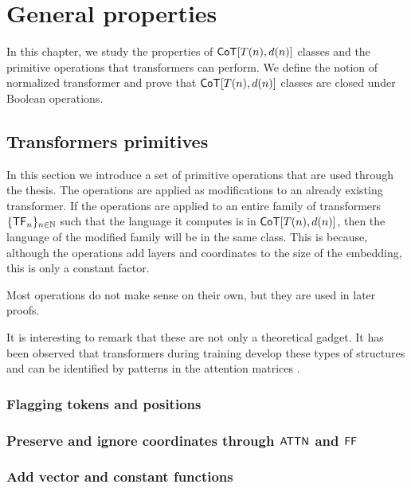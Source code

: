 \chapter{General properties}

In this chapter, we study the properties of $\mathsf{CoT}[T(n), d(n)]$ classes and the primitive operations that transformers can perform.
We define the notion of normalized transformer and prove that $\mathsf{CoT}[T(n), d(n)]$ classes are closed  under Boolean operations.


\section{Transformers primitives}

In this section we introduce a set of primitive operations that are used through the thesis.
The operations are applied as modifications to an already existing transformer.
If the operations are applied to an entire family of transformers $\{\mathsf{TF}_n\}_{n \in \mathbb{N}}$ such that the language it computes is in $\mathsf{CoT}[T(n), d(n)]$, then the language of the modified family will be in the same class.
This is because, although the operations add layers and coordinates to the size of the embedding, this is only a constant factor.

Most operations do not make sense on their own, but they are used in later proofs.

It is interesting to remark that these are not only a theoretical gadget.
It has been observed that transformers during training develop these types of structures and can be identified by patterns in the attention matrices \citep{olsson2022context}.


\subsection{Flagging tokens and positions}



\subsection{Preserve and ignore coordinates through \texorpdfstring{$\mathsf{ATTN}$}{ATTN} and \texorpdfstring{$\mathsf{FF}$}{FF}}



\subsection{Add vector and constant functions}\label{const-fun}

